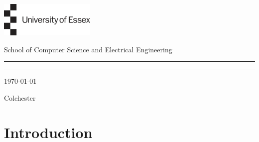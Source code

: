 \documentclass[12pt, a4paper,twoside]{report}
\theoremstyle{plain} %
\theoremstyle{definition} %
\numberwithin{equation}{chapter}
\begin{document}


\thispagestyle{empty} %

\noindent
    \begin{minipage}{0.1\textwidth}
    \includegraphics[height=4.5em]{essex.png}
    \end{minipage}
    \hfill
    \begin{minipage}{0.5\textwidth}
    \begin{center}
        \renewcommand\familydefault{\sfdefault}
        \selectfont
        {\large School of Computer Science and Electrical Engineering}
    \end{center}
    \end{minipage}

\begin{center}
    \noindent\textcolor{myred}{\rule{\linewidth}{4.8pt}}
    
    \vspace{2em}
    
    \vspace{3em}
    
    \vspace{3em}
    \vfill
    
    \vspace{0.5em}
    \noindent\textcolor{myred}{\rule{\linewidth}{4.8pt}}
    
    \vspace{2em}
    {\Large \today }
    
    {\Large Colchester}
\end{center}

\clearpage


\tableofcontents


\chapter{Introduction}\label{ch:introduction}
\end{document}
